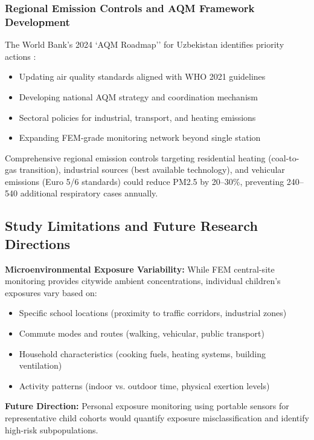 \documentclass[11pt,a4paper]{article}
\begin{document}
\subsubsection{Regional Emission Controls and AQM Framework Development}

The World Bank's 2024 `AQM Roadmap'' for Uzbekistan identifies priority actions \citep{worldbank2024tashkent}:
\begin{itemize}
    \item Updating air quality standards aligned with WHO 2021 guidelines
    \item Developing national AQM strategy and coordination mechanism
    \item Sectoral policies for industrial, transport, and heating emissions
    \item Expanding FEM-grade monitoring network beyond single station
\end{itemize}

Comprehensive regional emission controls targeting residential heating (coal-to-gas transition), industrial sources (best available technology), and vehicular emissions (Euro 5/6 standards) could reduce PM2.5 by 20--30\%, preventing 240--540 additional respiratory cases annually.

\subsection{Study Limitations and Future Research Directions}

\textbf{Microenvironmental Exposure Variability:} While FEM central-site monitoring provides citywide ambient concentrations, individual children's exposures vary based on:
\begin{itemize}
    \item Specific school locations (proximity to traffic corridors, industrial zones)
    \item Commute modes and routes (walking, vehicular, public transport)
    \item Household characteristics (cooking fuels, heating systems, building ventilation)
    \item Activity patterns (indoor vs. outdoor time, physical exertion levels)
\end{itemize}

\textbf{Future Direction:} Personal exposure monitoring using portable sensors for representative child cohorts would quantify exposure misclassification and identify high-risk subpopulations.
\end{document}
